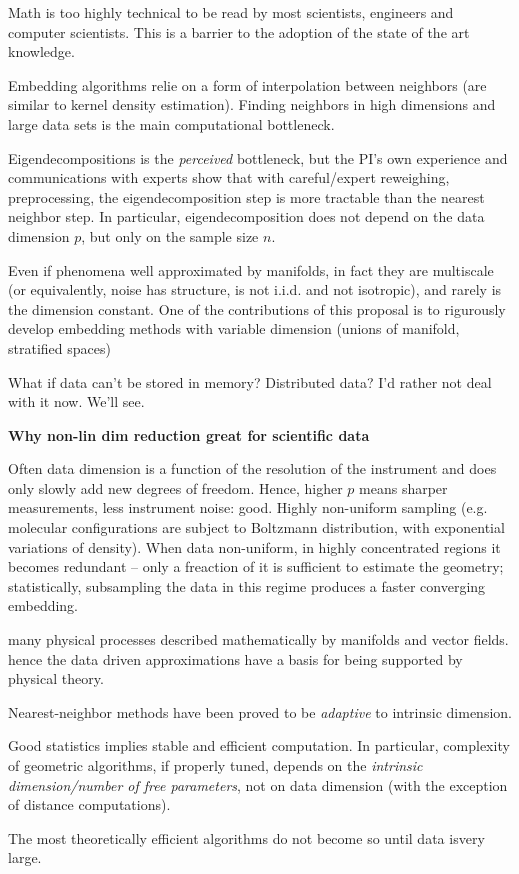 \documentclass[floatfix,11pt]{article}
\begin{document}
\item Math is too highly technical to be read by most scientists, engineers and computer scientists. This is a barrier to the adoption of the state of the art knowledge. 
\item Embedding algorithms relie on a form of interpolation between neighbors (are similar to kernel density estimation). Finding neighbors in high dimensions and large data sets is the main computational bottleneck. 
\item Eigendecompositions is the {\em perceived} bottleneck, but the PI's own experience and communications with experts show that with careful/expert reweighing, preprocessing, the eigendecomposition step is more tractable than the nearest neighbor step. In particular, eigendecomposition does not depend on the data dimension $p$, but only on the sample size $n$. 
\item Even if phenomena well approximated by manifolds, in fact they are multiscale (or equivalently, noise has structure, is not i.i.d. and not isotropic), and rarely is the dimension constant. One of the contributions of this proposal is to rigurously develop embedding methods with variable dimension (unions of manifold, stratified spaces)
\item What if data can't be stored in memory? Distributed data? I'd rather not deal with it now. We'll see. 
  \eit
  
  {\bf Why non-lin dim reduction great for scientific data}
  \bit
  \item Often data
dimension is a function of the resolution of the instrument and does
only slowly add new degrees of freedom. Hence, higher $p$ means
sharper measurements, less instrument noise: good. Highly non-uniform
sampling (e.g. molecular configurations are subject to Boltzmann
distribution, with exponential variations of density). When data
non-uniform, in highly concentrated regions it becomes redundant --
only a freaction of it is sufficient to estimate the geometry;
statistically, subsampling the data in this regime produces a faster
converging embedding.
\item many physical processes described mathematically by manifolds and vector fields. hence the data driven approximations have a basis for being supported by physical theory.
\item Nearest-neighbor methods have been proved to be {\em adaptive} to intrinsic dimension.
\item Good statistics implies stable and efficient computation. In particular, complexity of geometric algorithms, if properly tuned, depends on the {\em intrinsic dimension/number of free parameters}, not on data dimension (with the exception of distance computations). 
\item The most theoretically efficient algorithms do not become so until data isvery large.
\eit
\end{document}
